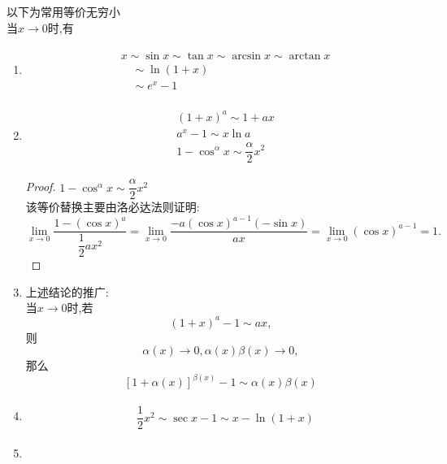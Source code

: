 \documentclass[8pt a4paper, oneside, UTF8]{ctexbook}
\begin{document}
\begin{sloppypar}
    以下为常用等价无穷小
    \\当$x \to 0$时,有
    \begin{enumerate}
        \item     \begin{align*} \boxed{\begin{aligned}& x \sim \sin x \sim \tan x \sim \arcsin x \sim \arctan x \nonumber \\& \quad  \sim \ln (1+x)  \nonumber                                  \\& \quad \sim e^x -1 \nonumber\end{aligned} }\end{align*}
        \item     
        \begin{align*} 
            \boxed{
                \begin{aligned}
                    & (1+x)^a \sim  1+ax   \\
                    & a^x - 1 \sim x \ln a \\
                    & 1- \cos^{\alpha} x \sim \dfrac{\alpha}{2}x^2 
                \end{aligned}
                }
        \end{align*}
        \begin{proof}{$1- \cos^{\alpha} x \sim \dfrac{\alpha}{2}x^2$}
            \\ 该等价替换主要由洛必达法则证明:$$
                \lim_{x\to0}\dfrac{1-(\cos x)^a}{\dfrac12ax^2}=\lim_{x\to0}\dfrac{-a(\cos x)^{a-1}(-\sin x)}{ax}=\lim_{x\to0}(\cos x)^{a-1}=1.
            $$
        \end{proof}
        \item  上述结论的推广:\\
        当$x \to 0$时,若$$(1+x)^a -1 \sim ax,$$则$$\alpha (x) \to 0,\alpha(x)\beta(x) \to 0,$$那么$$[1+\alpha(x)]^{\beta(x)} -1 \sim \alpha(x) \beta(x)$$
        \item     \begin{align*} \boxed
            {
                \begin{aligned}
                     & \dfrac{1}{2} x^2  \sim \sec x -1 \sim x- \ln(1+x)
                \end{aligned}
            }
        \end{align*}
        \item     \begin{align*} \boxed
            {
                \begin{aligned}

\end{aligned}}
\end{align*}
\end{enumerate}
\end{sloppypar}
\end{document}
